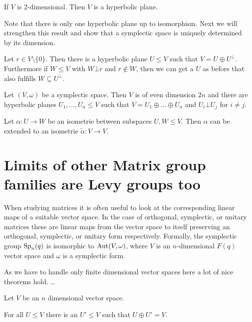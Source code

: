 \begin{lemma}
If $V$ is 2-dimensional. Then $V$ is a hyperbolic plane.
\end{lemma}
Note that there is only one hyperbolic plane up to isomorphism. Next we will strengthen this result and show that a symplectic space is uniquely determined by its dimension.

\begin{lemma}
Let $r\in V\setminus\{0\}$. Then there is a hyperbolic plane $U\leq V$ such that $V=U\oplus U^\bot$. Furthermore if $W\leq V$ with $W\bot r$ and $r\notin W$, then we can get a $U$ as before that also fulfills $W\subseteq U^\bot$.
\end{lemma}

\begin{theorem}

Let $(V,\omega)$ be a symplectic space. Then $V$ is of even dimension $2n$ and there are hyperbolic planes $U_1,\dots, U_n\leq V$ such that $V=U_1\oplus\dots\oplus U_n$ and $U_i\bot U_j$ for $i\not=j$.
\end{theorem}

\begin{lemma}
Let $\alpha\colon U\to W$ be an isometrie between subspaces $U,W\leq V$. Then $\alpha$ can be extended to an isometrie $\tilde{\alpha}\colon V\to V$.
\end{lemma}



\section{Limits of other Matrix group families are Levy groups too}
When studying matrices it is often useful to look at the corresponding linear maps of a suitable vector space. In the case of orthogonal, symplectic, or unitary matrices these are linear maps from the vector space to itself preserving an orthogonal, symplectic, or unitary form respectively. Formally, the symplectic group $\operatorname{Sp}_n(q)$ is isomorphic to $\operatorname{Aut}(V,\omega)$, where $V$ is an $n$-dimensional $F(q)$ vector space and $\omega$ is a symplectic form.

As we have to handle only finite dimensional vector spaces here a lot of nice theorems hold. \dots

Let $V$ be an $n$ dimensional vector space.%
\begin{lemma}\label{lem:complementExists}
For all $U\leq V$ there is an $U'\leq V$ such that $U\oplus U'=V$.
\end{lemma}


